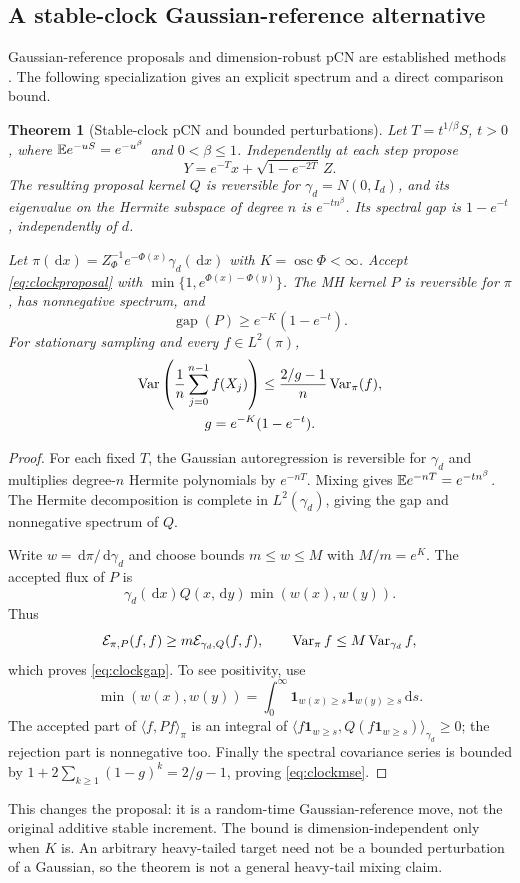 \documentclass[pdflatex,iicol,sn-mathphys-ay]{sn-jnl}
\newtheorem{theorem}{Theorem}[section]
\theoremstyle{definition}\newtheorem{definition}[theorem]{Definition}
\theoremstyle{remark}\newtheorem{remark}[theorem]{Remark}
\numberwithin{equation}{section}
\newcommand{\dd}{\,\mathrm d}\newcommand{\cA}{c_\alpha}\newcommand{\sg}{\operatorname{sigmoid}}
\newcommand{\gap}{\operatorname{gap}}\newcommand{\osc}{\operatorname{osc}}
\newcommand{\1}{\mathbf 1}
\begin{document}
\subsection{A stable-clock Gaussian-reference alternative}
Gaussian-reference proposals and dimension-robust pCN are established methods \citep{cotter,hairer}. The following specialization gives an explicit spectrum and a direct comparison bound.
\begin{theorem}[Stable-clock pCN and bounded perturbations]\label{thm:clock}
Let $T=t^{1/\beta}S$, $t>0$, where $\mathbb E e^{-uS}=e^{-u^\beta}$ and $0<\beta\le1$. Independently at each step propose
\begin{equation}
Y=e^{-T}x+\sqrt{1-e^{-2T}}\,Z.\label{eq:clockproposal}
\end{equation}
The resulting proposal kernel $Q$ is reversible for $\gamma_d=N(0,I_d)$, and its eigenvalue on the Hermite subspace of degree $n$ is $e^{-tn^\beta}$. Its spectral gap is $1-e^{-t}$, independently of $d$.

Let $\pi(\dd x)=Z_\Phi^{-1}e^{-\Phi(x)}\gamma_d(\dd x)$ with $K=\osc\Phi<\infty$. Accept \eqref{eq:clockproposal} with $\min\{1,e^{\Phi(x)-\Phi(y)}\}$. The MH kernel $P$ is reversible for $\pi$, has nonnegative spectrum, and
\begin{equation}
\gap(P)\ge e^{-K}(1-e^{-t}).\label{eq:clockgap}
\end{equation}
For stationary sampling and every $f\in L^2(\pi)$,
\begin{equation}
\begin{gathered}
\operatorname{Var}\left(\frac1n\sum_{j=0}^{n-1}f(X_j)\right)
\le\frac{2/g-1}{n}\operatorname{Var}_\pi(f),\\
g=e^{-K}(1-e^{-t}).
\end{gathered}\label{eq:clockmse}
\end{equation}
\end{theorem}
\begin{proof}
For each fixed $T$, the Gaussian autoregression is reversible for $\gamma_d$ and multiplies degree-$n$ Hermite polynomials by $e^{-nT}$. Mixing gives $\mathbb E e^{-nT}=e^{-tn^\beta}$. The Hermite decomposition is complete in $L^2(\gamma_d)$, giving the gap and nonnegative spectrum of $Q$.

Write $w=\dd\pi/\dd\gamma_d$ and choose bounds $m\le w\le M$ with $M/m=e^K$. The accepted flux of $P$ is
\[
\gamma_d(\dd x)Q(x,\dd y)\min(w(x),w(y)).
\]
Thus
\[
\mathcal E_{\pi,P}(f,f)\ge m\mathcal E_{\gamma_d,Q}(f,f),\qquad
\operatorname{Var}_\pi f\le M\operatorname{Var}_{\gamma_d}f,
\]
which proves \eqref{eq:clockgap}. To see positivity, use
\[
\min(w(x),w(y))=\int_0^\infty\1_{w(x)\ge s}\1_{w(y)\ge s}\dd s.
\]
The accepted part of $\langle f,Pf\rangle_\pi$ is an integral of
$\langle f\1_{w\ge s},Q(f\1_{w\ge s})\rangle_{\gamma_d}\ge0$; the rejection part is nonnegative too. Finally the spectral covariance series is bounded by $1+2\sum_{k\ge1}(1-g)^k=2/g-1$, proving \eqref{eq:clockmse}.
\end{proof}
This changes the proposal: it is a random-time Gaussian-reference move, not the original additive stable increment. The bound is dimension-independent only when $K$ is. An arbitrary heavy-tailed target need not be a bounded perturbation of a Gaussian, so the theorem is not a general heavy-tail mixing claim.
\end{document}
